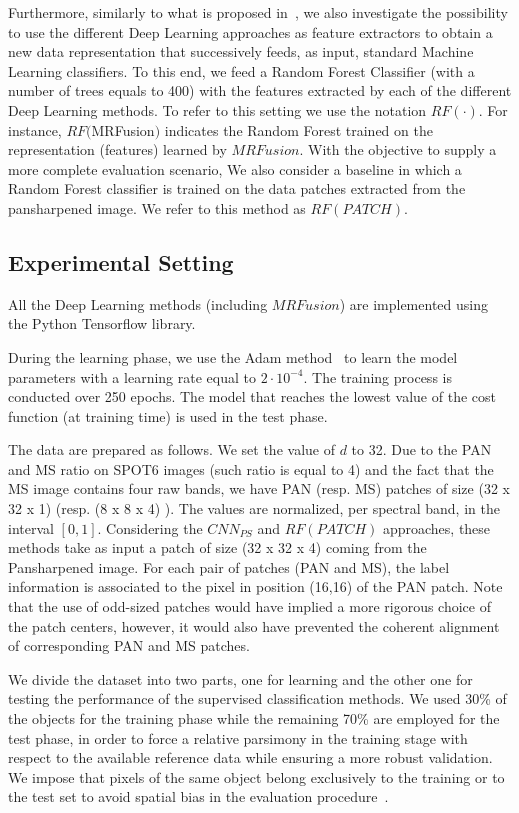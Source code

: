 \documentclass[journal]{IEEEtran}
\newcommand{\method}{$MRFusion$}
\begin{document}
Furthermore, similarly to what is proposed in~\cite{IencoGDM17}, we also investigate the possibility to use the different Deep Learning approaches as feature extractors to obtain a new data representation that successively feeds, as input, standard Machine Learning classifiers. To this end, we feed a Random Forest Classifier (with a number of trees equals to 400) with the features extracted by each of the different Deep Learning methods. To refer to this setting we use the notation $RF(\cdot)$. For instance, $RF(\method)$ indicates the Random Forest trained on the representation (features) learned by \method{}. With the objective to supply a more complete evaluation scenario, We also consider a baseline in which a Random Forest classifier is trained on the data patches extracted from the pansharpened image. We refer to this method as $RF(PATCH)$.

\subsection{Experimental Setting}
All the Deep Learning methods (including \method{}) are implemented using the Python Tensorflow library.

During the learning phase, we use the Adam method~\cite{KingmaB14} to learn the model parameters with a learning rate equal to $2 \cdot 10^{-4}$. The training process is conducted over 250 epochs. The model that reaches the lowest value of the cost function (at training time) is used in the test phase.

The data are prepared as follows. We set the value of $d$ to 32. Due to the PAN and MS ratio on SPOT6 images (such ratio is equal to 4) and the fact that the MS image contains four raw bands, we have PAN (resp. MS) patches of size (32 x 32 x 1) (resp. (8 x 8 x 4) ). The values are normalized, per spectral band, in the interval $[0,1]$. Considering the $CNN_{PS}$ and $RF(PATCH)$ approaches, these methods take as input a patch of size (32 x 32 x 4) coming from the Pansharpened image. For each pair of patches (PAN and MS), the label information is associated to the pixel in position (16,16) of the PAN patch. Note that the use of odd-sized patches would have implied a more rigorous choice of the patch centers, however, it would also have prevented the coherent alignment of corresponding PAN and MS patches.

We divide the dataset into two parts, one for learning and the other one for testing the performance of the supervised classification methods. We used 30\% of the objects for the training phase while the remaining 70\% are employed for the test phase, in order to force a relative parsimony in the training stage with respect to the available reference data while ensuring a more robust validation. We impose that pixels of the same object belong exclusively to the training or to the test set to avoid spatial bias in the evaluation procedure~\cite{IngladaVATMR17}.
\end{document}
